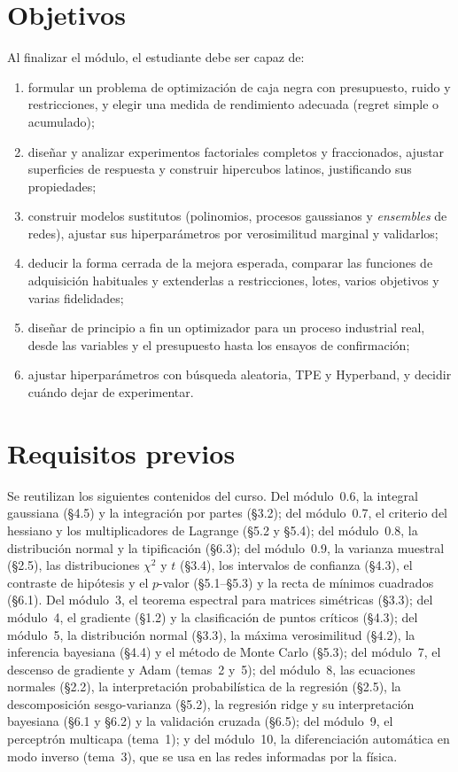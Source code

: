 \documentclass[11pt,a4paper,twoside,openany]{book}
\begin{document}
\section*{Objetivos}
Al finalizar el módulo, el estudiante debe ser capaz de:
\begin{enumerate}[label=\arabic*.]
  \item formular un problema de optimización de caja negra con presupuesto, ruido y restricciones, y elegir una medida de rendimiento adecuada (regret simple o acumulado);
  \item diseñar y analizar experimentos factoriales completos y fraccionados, ajustar superficies de respuesta y construir hipercubos latinos, justificando sus propiedades;
  \item construir modelos sustitutos (polinomios, procesos gaussianos y \emph{ensembles} de redes), ajustar sus hiperparámetros por verosimilitud marginal y validarlos;
  \item deducir la forma cerrada de la mejora esperada, comparar las funciones de adquisición habituales y extenderlas a restricciones, lotes, varios objetivos y varias fidelidades;
  \item diseñar de principio a fin un optimizador para un proceso industrial real, desde las variables y el presupuesto hasta los ensayos de confirmación;
  \item ajustar hiperparámetros con búsqueda aleatoria, TPE y Hyperband, y decidir cuándo dejar de experimentar.
\end{enumerate}

\section*{Requisitos previos}
Se reutilizan los siguientes contenidos del curso. Del módulo~0.6, la integral gaussiana (§4.5) y la integración por partes (§3.2); del módulo~0.7, el criterio del hessiano y los multiplicadores de Lagrange (§5.2 y §5.4); del módulo~0.8, la distribución normal y la tipificación (§6.3); del módulo~0.9, la varianza muestral (§2.5), las distribuciones $\chi^2$ y $t$ (§3.4), los intervalos de confianza (§4.3), el contraste de hipótesis y el $p$-valor (§5.1–§5.3) y la recta de mínimos cuadrados (§6.1). Del módulo~3, el teorema espectral para matrices simétricas (§3.3); del módulo~4, el gradiente (§1.2) y la clasificación de puntos críticos (§4.3); del módulo~5, la distribución normal (§3.3), la máxima verosimilitud (§4.2), la inferencia bayesiana (§4.4) y el método de Monte Carlo (§5.3); del módulo~7, el descenso de gradiente y Adam (temas~2 y~5); del módulo~8, las ecuaciones normales (§2.2), la interpretación probabilística de la regresión (§2.5), la descomposición sesgo-varianza (§5.2), la regresión ridge y su interpretación bayesiana (§6.1 y §6.2) y la validación cruzada (§6.5); del módulo~9, el perceptrón multicapa (tema~1); y del módulo~10, la diferenciación automática en modo inverso (tema~3), que se usa en las redes informadas por la física.
\end{document}
